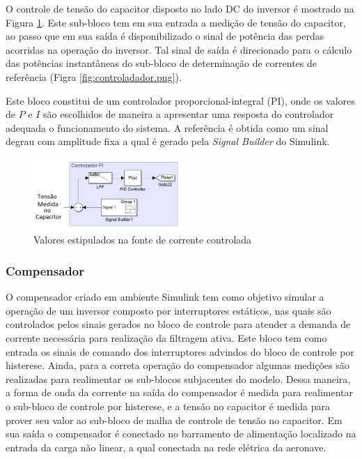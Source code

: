 O controle de tensão do capacitor disposto no lado DC do inversor é mostrado na Figura \ref{fig:PI_sim.png}. Este sub-bloco tem em sua entrada a medição de tensão do capacitor, ao passo que em sua saída é disponibilizado o sinal de potência das perdas acorridas na operação do inversor. Tal sinal de saída é direcionado para o cálculo das potências instantâneas do sub-bloco de determinação de correntes de referência (Figra \ref{fig:controladador.png}).

Este bloco constitui de um controlador proporcional-integral (PI), onde os valores de $P$ e $I$ são escolhidos de maneira a apresentar uma resposta do controlador adequada o funcionamento do sistema. A referência é obtida como um sinal degrau com amplitude fixa a qual é gerado pela \textit{Signal Builder} do Simulink. 

\begin{figure}[!htb] %
	\centering
	\includegraphics[width=0.5\textwidth]{Cap4/Figuras/PI_sim.png}
	\caption{Valores estipulados na fonte de corrente controlada}
	\label{fig:PI_sim.png}
\end{figure}

\subsubsection{Compensador}

O compensador criado em ambiente Simulink tem como objetivo simular a operação de um inversor composto por interruptores estáticos, nas quais são controlados pelos sinais gerados no bloco de controle para atender a demanda de corrente necessária para realização da filtragem ativa. Este bloco tem como entrada os sinais de comando dos interruptores advindos do bloco de controle por histerese. Ainda, para a correta operação do compensador algumas medições são realizadas para realimentar os sub-blocos subjacentes do modelo. Dessa maneira, a forma de onda da corrente na saída do compensador é medida para realimentar o sub-bloco de controle por histerese, e a tensão no capacitor é medida para prover seu valor ao sub-bloco de malha de controle de tensão no capacitor. Em sua saída o compensador é conectado no barramento de alimentação localizado na entrada da carga não linear, a qual conectada na rede elétrica da aeronave.

